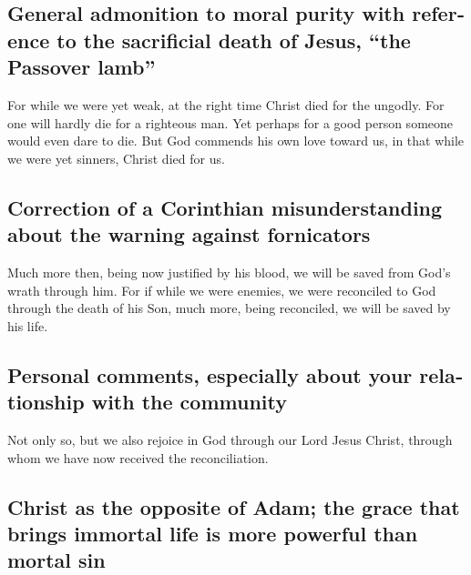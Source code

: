 \begin{paracol}{2}
\begin{otherlanguage}{english}
{\subsection{General admonition to moral purity with reference to the
sacrificial death of Jesus, ``the Passover
lamb''}\label{general-admonition-to-moral-purity-with-reference-to-the-sacrificial-death-of-jesus-the-passover-lamb}}

 For while we were yet weak, at the right time Christ died
for the ungodly.  For one will hardly die for a righteous
man. Yet perhaps for a good person someone would even dare to die.
 But God commends his own love toward us, in that while we
were yet sinners, Christ died for us.

\hypertarget{correction-of-a-corinthian-misunderstanding-about-the-warning-against-fornicators}{%
\subsection{Correction of a Corinthian misunderstanding about the
warning against
fornicators}\label{correction-of-a-corinthian-misunderstanding-about-the-warning-against-fornicators}}

 Much more then, being now justified by his blood, we will
be saved from God's wrath through him.  For if while we
were enemies, we were reconciled to God through the death of his Son,
much more, being reconciled, we will be saved by his life.

\hypertarget{personal-comments-especially-about-your-relationship-with-the-community}{%
\subsection{Personal comments, especially about your relationship with
the
community}\label{personal-comments-especially-about-your-relationship-with-the-community}}

 Not only so, but we also rejoice in God through our Lord
Jesus Christ, through whom we have now received the reconciliation.

\hypertarget{christ-as-the-opposite-of-adam-the-grace-that-brings-immortal-life-is-more-powerful-than-mortal-sin}{%
\subsection{Christ as the opposite of Adam; the grace that brings
immortal life is more powerful than mortal
sin}\label{christ-as-the-opposite-of-adam-the-grace-that-brings-immortal-life-is-more-powerful-than-mortal-sin}}


\end{otherlanguage}
\end{paracol}
